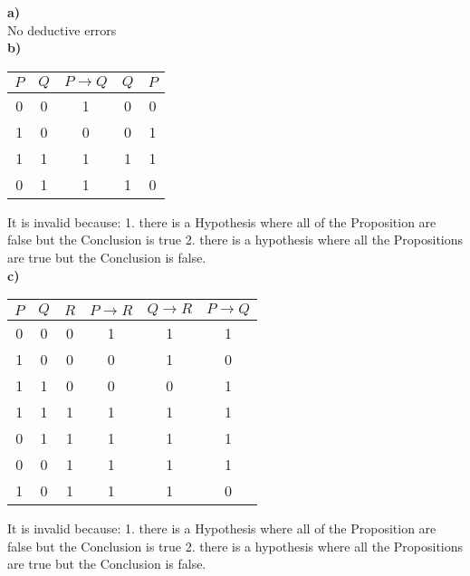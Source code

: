 \documentclass[letterpaper]{article}
\renewcommand\subsection{}
\begin{document}
    	\subsection{\bf a) \sf} \\
        No deductive errors \\
        \subsection{\bf b) \sf}
        	\begin{center}
        		\begin{tabular}{|c|c||c|c|c|}
                	\hline
        			$P$ & $Q$ & $P \rightarrow Q$ & $Q$ & $P$ \\
                    \hline
                    0 & 0 & 1 & 0 & 0\\
                    \hline
                    1 & 0 & 0 & 0 & 1\\
                    \hline
                    1 & 1 & 1 & 1 & 1\\
                    \hline
                    0 & 1 & 1 & 1 & 0\\
                    \hline
        		\end{tabular}
        	\end{center}
            It is invalid because: 1. there is a Hypothesis where all of the Proposition are false but the Conclusion is true 
            2. there is a hypothesis where all the Propositions are true but the Conclusion is false.\\
       \subsection{\bf c) \sf}
       		\begin{center}
       			\begin{tabular}{|c|c|c||c|c|c|}
       				\hline
                    $P$ & $Q$ & $R$ & $P \rightarrow R$ & $Q \rightarrow R$ & $P \rightarrow Q$ \\
                    \hline
                    0 & 0 & 0 & 1 & 1 & 1 \\
                    \hline
                    1 & 0 & 0 & 0 & 1 & 0 \\
                    \hline
                    1 & 1 & 0 & 0 & 0 & 1 \\
                    \hline
                    1 & 1 & 1 & 1 & 1 & 1 \\
                    \hline
                    0 & 1 & 1 & 1 & 1 & 1 \\
                    \hline
                    0 & 0 & 1 & 1 & 1 & 1 \\
                    \hline
                    1 & 0 & 1 & 1 & 1 & 0 \\
                    \hline
       			\end{tabular}
       		\end{center}
            It is invalid because: 1. there is a Hypothesis where all of the Proposition are false but the Conclusion is true 
            2. there is a hypothesis where all the Propositions are true but the Conclusion is false.
\end{document}
